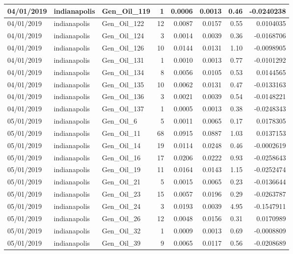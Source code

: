 \documentclass[
  letterpaper,
  DIV=11,
  numbers=noendperiod]{scrartcl}
\begin{document}
\begin{tabular}{l|l|l|r|r|r|r|r}
\hline
04/01/2019 & indianapolis & Gen\_Oil\_119 & 1 & 0.0006 & 0.0013 & 0.46 & -0.0240238\\
\hline
04/01/2019 & indianapolis & Gen\_Oil\_122 & 12 & 0.0087 & 0.0157 & 0.55 & 0.0104035\\
\hline
04/01/2019 & indianapolis & Gen\_Oil\_124 & 3 & 0.0014 & 0.0039 & 0.36 & -0.0168706\\
\hline
04/01/2019 & indianapolis & Gen\_Oil\_126 & 10 & 0.0144 & 0.0131 & 1.10 & -0.0098905\\
\hline
04/01/2019 & indianapolis & Gen\_Oil\_131 & 1 & 0.0010 & 0.0013 & 0.77 & -0.0101292\\
\hline
04/01/2019 & indianapolis & Gen\_Oil\_134 & 8 & 0.0056 & 0.0105 & 0.53 & 0.0144565\\
\hline
04/01/2019 & indianapolis & Gen\_Oil\_135 & 10 & 0.0062 & 0.0131 & 0.47 & -0.0133163\\
\hline
04/01/2019 & indianapolis & Gen\_Oil\_136 & 3 & 0.0021 & 0.0039 & 0.54 & -0.0148221\\
\hline
04/01/2019 & indianapolis & Gen\_Oil\_137 & 1 & 0.0005 & 0.0013 & 0.38 & -0.0248343\\
\hline
05/01/2019 & indianapolis & Gen\_Oil\_6 & 5 & 0.0011 & 0.0065 & 0.17 & 0.0178305\\
\hline
05/01/2019 & indianapolis & Gen\_Oil\_11 & 68 & 0.0915 & 0.0887 & 1.03 & 0.0137153\\
\hline
05/01/2019 & indianapolis & Gen\_Oil\_14 & 19 & 0.0114 & 0.0248 & 0.46 & -0.0002619\\
\hline
05/01/2019 & indianapolis & Gen\_Oil\_16 & 17 & 0.0206 & 0.0222 & 0.93 & -0.0258643\\
\hline
05/01/2019 & indianapolis & Gen\_Oil\_19 & 11 & 0.0164 & 0.0143 & 1.15 & -0.0252474\\
\hline
05/01/2019 & indianapolis & Gen\_Oil\_21 & 5 & 0.0015 & 0.0065 & 0.23 & -0.0136644\\
\hline
05/01/2019 & indianapolis & Gen\_Oil\_23 & 15 & 0.0057 & 0.0196 & 0.29 & -0.0263787\\
\hline
05/01/2019 & indianapolis & Gen\_Oil\_24 & 3 & 0.0193 & 0.0039 & 4.95 & -0.1547911\\
\hline
05/01/2019 & indianapolis & Gen\_Oil\_26 & 12 & 0.0048 & 0.0156 & 0.31 & 0.0170989\\
\hline
05/01/2019 & indianapolis & Gen\_Oil\_32 & 1 & 0.0009 & 0.0013 & 0.69 & -0.0008809\\
\hline
05/01/2019 & indianapolis & Gen\_Oil\_39 & 9 & 0.0065 & 0.0117 & 0.56 & -0.0208689\\

\end{tabular}
\end{document}
